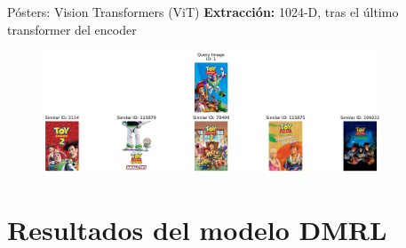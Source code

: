 \documentclass{beamer}
\begin{document}
\begin{frame}{Pósters: Vision Transformers (ViT)}
    \textbf{Extracción:} 1024-D, tras el último transformer del encoder

    \begin{figure}
        \centering
        \includegraphics[width=0.9\textwidth]{images/vit_h14.png}
    \end{figure}
\end{frame}

\section*{Resultados del modelo DMRL}
\end{document}
